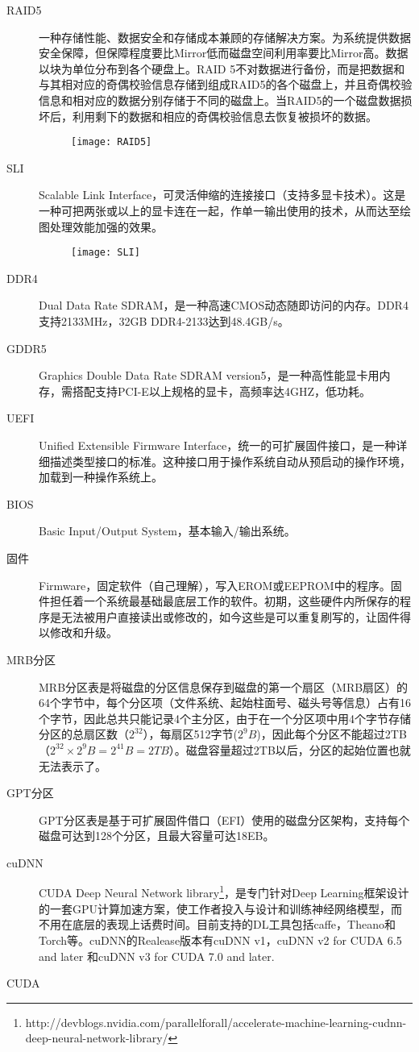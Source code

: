 \begin{description}
\item[RAID5] 一种存储性能、数据安全和存储成本兼顾的存储解决方案。为系统提供数据安全保障，但保障程度要比Mirror低而磁盘空间利用率要比Mirror高。数据以块为单位分布到各个硬盘上。RAID 5不对数据进行备份，而是把数据和与其相对应的奇偶校验信息存储到组成RAID5的各个磁盘上，并且奇偶校验信息和相对应的数据分别存储于不同的磁盘上。当RAID5的一个磁盘数据损坏后，利用剩下的数据和相应的奇偶校验信息去恢复被损坏的数据。
\begin{figure}[!ht]
\centering
\texttt{[image: RAID5]}
\end{figure}

\item[SLI] Scalable Link Interface，可灵活伸缩的连接接口（支持多显卡技术）。这是一种可把两张或以上的显卡连在一起，作单一输出使用的技术，从而达至绘图处理效能加强的效果。
\begin{figure}[!ht]
\centering
\texttt{[image: SLI]}
\end{figure}

\item[DDR4] Dual Data Rate SDRAM，是一种高速CMOS动态随即访问的内存。DDR4支持2133MHz，32GB DDR4-2133达到48.4GB/s。

\item[GDDR5] Graphics Double Data Rate SDRAM version5，是一种高性能显卡用内存，需搭配支持PCI-E以上规格的显卡，高频率达4GHZ，低功耗。

\item[UEFI] Unified Extensible Firmware Interface，统一的可扩展固件接口，是一种详细描述类型接口的标准。这种接口用于操作系统自动从预启动的操作环境，加载到一种操作系统上。
\item[BIOS] Basic Input/Output System，基本输入/输出系统。
\item[固件] Firmware，固定软件（自己理解），写入EROM或EEPROM中的程序。固件担任着一个系统最基础最底层工作的软件。初期，这些硬件内所保存的程序是无法被用户直接读出或修改的，如今这些是可以重复刷写的，让固件得以修改和升级。
\item[MRB分区] MRB分区表是将磁盘的分区信息保存到磁盘的第一个扇区（MRB扇区）的64个字节中，每个分区项（文件系统、起始柱面号、磁头号等信息）占有16个字节，因此总共只能记录4个主分区，由于在一个分区项中用4个字节存储分区的总扇区数（$2^{32}$），每扇区512字节($2^{9}B$)，因此每个分区不能超过2TB（$2^{32} \times 2^{9}B=2^{41}B=2TB$）。磁盘容量超过2TB以后，分区的起始位置也就无法表示了。
\item[GPT分区] GPT分区表是基于可扩展固件借口（EFI）使用的磁盘分区架构，支持每个磁盘可达到128个分区，且最大容量可达18EB。
\item[cuDNN] CUDA Deep Neural Network library\footnote{http://devblogs.nvidia.com/parallelforall/accelerate-machine-learning-cudnn-deep-neural-network-library/}，是专门针对Deep Learning框架设计的一套GPU计算加速方案，使工作者投入与设计和训练神经网络模型，而不用在底层的表现上话费时间。目前支持的DL工具包括caffe，Theano和Torch等。cuDNN的Realease版本有cuDNN v1，cuDNN v2 for CUDA 6.5 and later 和cuDNN v3 for CUDA 7.0 and later.
\item[CUDA]
\end{description}



